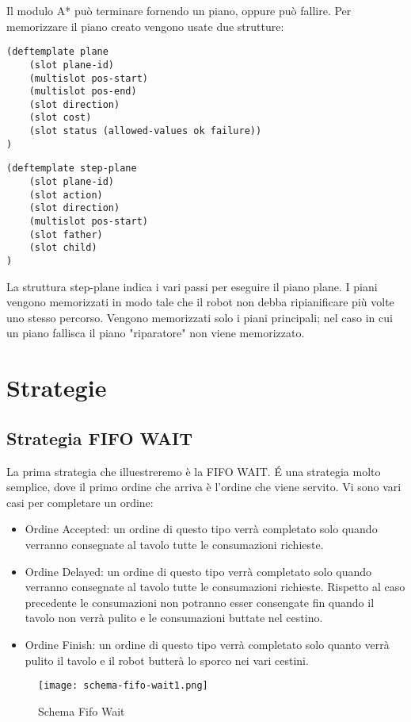 Il modulo A* può terminare fornendo un piano, oppure può fallire. Per memorizzare il piano creato vengono usate due strutture:

\begin{lstlisting}
(deftemplate plane 
	(slot plane-id) 
	(multislot pos-start) 
	(multislot pos-end) 
	(slot direction) 
	(slot cost) 
	(slot status (allowed-values ok failure))
)
\end{lstlisting}
\begin{lstlisting}
(deftemplate step-plane 
	(slot plane-id)
	(slot action)
	(slot direction)
	(multislot pos-start)
	(slot father)
	(slot child)
)
\end{lstlisting}

La struttura step-plane indica i vari passi per eseguire il piano plane. I piani vengono memorizzati in modo tale che il robot non debba ripianificare più volte uno stesso percorso. Vengono memorizzati solo i piani principali; nel caso in cui un piano fallisca il piano "riparatore" non viene memorizzato.

\chapter{Strategie}
\section{Strategia FIFO WAIT}
La prima strategia che illuestreremo è la FIFO WAIT. \'E una strategia molto semplice, dove il primo ordine che arriva è l'ordine che viene servito. Vi sono vari casi per completare un ordine:\begin{itemize}
  \item Ordine Accepted: un ordine di questo tipo verrà completato solo quando verranno consegnate al tavolo tutte le consumazioni richieste.
  \item Ordine Delayed: un ordine di questo tipo verrà completato solo quando verranno consegnate al tavolo tutte le consumazioni richieste. Rispetto al caso precedente le consumazioni non potranno esser consengate fin quando il tavolo non verrà pulito e le consumazioni buttate nel cestino.
  \item Ordine Finish: un ordine di questo tipo verrà completato solo quanto verrà pulito il tavolo e il robot butterà lo sporco nei vari cestini.
\end{itemize}
\newpage

\begin{figure}[htp]
  \texttt{[image: schema-fifo-wait1.png]}
  \caption{Schema Fifo Wait}
  \label{fig:figure1}
\end{figure}


